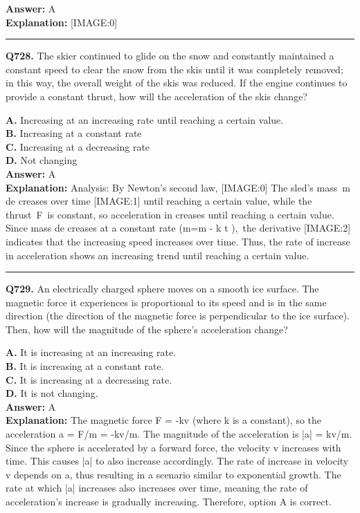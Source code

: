 \documentclass[12pt]{article}
\begin{document}
\textbf{Answer:} A \\
\textbf{Explanation:} [IMAGE:0]

\hrule
\vspace{1em}


\noindent
\textbf{Q728.} The skier continued to glide on the snow and constantly maintained a constant speed to clear the snow from the skis until it was completely removed; in this way, the overall weight of the skis was reduced. If the engine continues to provide a constant thrust, how will the acceleration of the skis change?



\textbf{A.} Increasing at an increasing rate
until reaching a certain value. \\
\textbf{B.} Increasing at a constant rate \\
\textbf{C.} Increasing at a decreasing rate \\
\textbf{D.} Not changing \\

\textbf{Answer:} A \\
\textbf{Explanation:} Analysis: By Newton's second law,
[IMAGE:0]
The sled's mass m
de
creases over time
[IMAGE:1]
until reaching a certain value,
while the thrust F is constant, so acceleration
in
creases
until reaching a certain value. Since mass
de
creases at a constant rate (m=m
-
k
t
), the derivative
[IMAGE:2]
indicates that the increasing speed increases over time.
Thus, the rate of increase in acceleration shows an increasing trend until reaching a certain value.

\hrule
\vspace{1em}


\noindent
\textbf{Q729.} An electrically charged sphere moves on a smooth ice surface. The magnetic force it experiences is proportional to its speed and is in the same direction (the direction of the magnetic force is perpendicular to the ice surface). Then, how will the magnitude of the sphere's acceleration change?



\textbf{A.} It is increasing at an increasing rate. \\
\textbf{B.} It is increasing at a constant rate. \\
\textbf{C.} It is increasing at a decreasing rate. \\
\textbf{D.} It is not changing. \\

\textbf{Answer:} A \\
\textbf{Explanation:} The magnetic force F = -kv (where k is a constant), so the acceleration a = F/m = -kv/m. The magnitude of the acceleration is |a| = kv/m. Since the sphere is accelerated by a forward force, the velocity v increases with time. This causes |a| to also increase accordingly. The rate of increase in velocity v depends on a, thus resulting in a scenario similar to exponential growth. The rate at which |a| increases also increases over time, meaning the rate of acceleration's increase is gradually increasing. Therefore, option A is correct.
\end{document}
